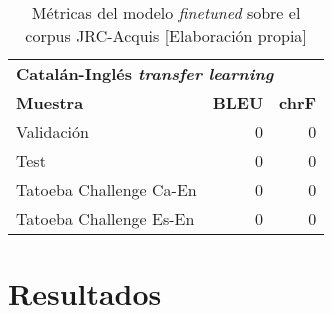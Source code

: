 \begin{table}[H]
    \begin{center}
        \begin{tabular}{ l r r }
        \multicolumn{3}{l}{\textbf{Catalán-Inglés \textit{transfer learning}}}\\
        \textbf{Muestra} & \textbf{BLEU} & \textbf{chrF} \\
        Validación & 0 & 0 \\
        Test & 0 & 0 \\
        Tatoeba Challenge Ca-En & 0 & 0 \\
        Tatoeba Challenge Es-En & 0 & 0
        \end{tabular}
        \caption{Métricas del modelo \textit{finetuned} sobre el corpus JRC-Acquis [Elaboración propia]}\label{transfercaen}
    \end{center}
\end{table}


\section{Resultados}
